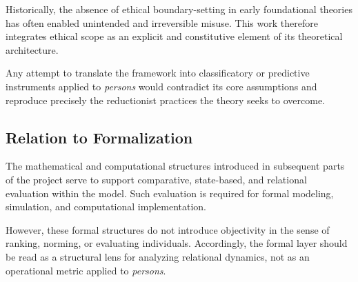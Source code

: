 Historically, the absence of ethical boundary-setting in early foundational theories
has often enabled unintended and irreversible misuse.
This work therefore integrates ethical scope as an explicit and constitutive element
of its theoretical architecture.

Any attempt to translate the framework into classificatory or predictive instruments
applied to \textit{persons} would contradict its core assumptions
and reproduce precisely the reductionist practices the theory seeks to overcome.

\subsection{Relation to Formalization}

The mathematical and computational structures introduced in subsequent parts of the project
serve to support comparative, state-based, and relational evaluation within the model.
Such evaluation is required for formal modeling, simulation,
and computational implementation.

However, these formal structures do not introduce objectivity
in the sense of ranking, norming, or evaluating individuals.
Accordingly, the formal layer should be read as a structural lens
for analyzing relational dynamics, not as an operational metric applied to \textit{persons}.
